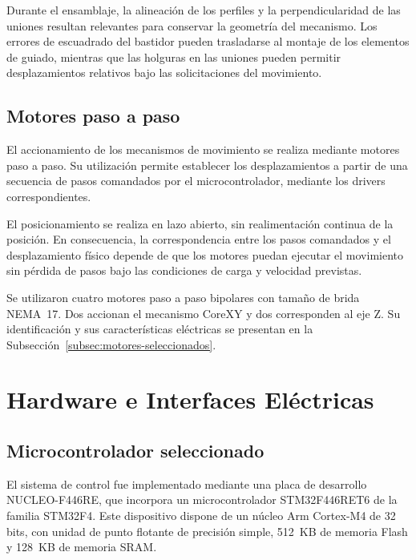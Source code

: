 \documentclass[blue,fullpaper]{ludusofficial}  %
\begin{document}
Durante el ensamblaje, la alineación de los perfiles
y la perpendicularidad de las uniones resultan
relevantes para conservar la geometría del mecanismo.
Los errores de escuadrado del bastidor pueden
trasladarse al montaje de los elementos de guiado,
mientras que las holguras en las uniones pueden
permitir desplazamientos relativos bajo las
solicitaciones del movimiento.



\subsection{Motores paso a paso}

El accionamiento de los mecanismos de movimiento se
realiza mediante motores paso a paso. Su utilización
permite establecer los desplazamientos a partir de una
secuencia de pasos comandados por el microcontrolador,
mediante los drivers correspondientes.

El posicionamiento se realiza en lazo abierto, sin
realimentación continua de la posición. En consecuencia,
la correspondencia entre los pasos comandados y el
desplazamiento físico depende de que los motores puedan
ejecutar el movimiento sin pérdida de pasos bajo las
condiciones de carga y velocidad previstas.

Se utilizaron cuatro motores paso a paso bipolares
con tamaño de brida NEMA~17. Dos accionan
el mecanismo CoreXY y dos corresponden al eje Z.
Su identificación y sus características eléctricas
se presentan en la Subsección~\ref{subsec:motores-seleccionados}.

\section{Hardware e Interfaces Eléctricas}

\subsection{Microcontrolador seleccionado}

El sistema de control fue implementado mediante una
placa de desarrollo NUCLEO-F446RE, que incorpora un
microcontrolador STM32F446RET6 de la familia STM32F4.
Este dispositivo dispone de un núcleo Arm Cortex-M4
de 32 bits, con unidad de punto flotante de precisión
simple, 512~KB de memoria Flash y 128~KB de memoria
SRAM.
\end{document}
